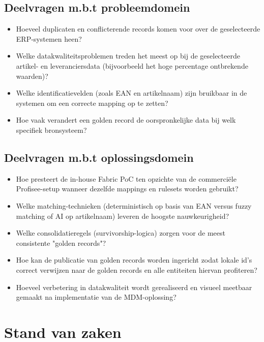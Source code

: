 \subsection{Deelvragen m.b.t probleemdomein}
\begin{itemize}
    \item Hoeveel duplicaten en conflicterende records komen voor over de geselecteerde ERP-systemen heen?
    \item Welke datakwaliteitsproblemen treden het meest op bij de geselecteerde artikel- en leveranciersdata (bijvoorbeeld het hoge percentage ontbrekende waarden)?
    \item Welke identificatievelden (zoals EAN en artikelnaam) zijn bruikbaar in de systemen om een correcte mapping op te zetten?
    \item Hoe vaak verandert een golden record de oorspronkelijke data bij welk specifiek bronsysteem?
\end{itemize}

\subsection{Deelvragen m.b.t oplossingsdomein}
\begin{itemize}
    \item Hoe presteert de in-house Fabric PoC ten opzichte van de commerciële Profisee-setup wanneer dezelfde mappings en rulesets worden gebruikt?
    \item Welke matching-technieken (deterministisch op basis van EAN versus fuzzy matching of AI op artikelnaam) leveren de hoogste nauwkeurigheid?
    \item Welke consolidatieregels (survivorship-logica) zorgen voor de meest consistente "golden records"?
    \item Hoe kan de publicatie van golden records worden ingericht zodat lokale id's correct verwijzen naar de golden records en alle entiteiten hiervan profiteren?
    \item Hoeveel verbetering in datakwaliteit wordt gerealiseerd en visueel meetbaar gemaakt na implementatie van de MDM-oplossing?
\end{itemize}






\section{Stand van zaken}%
\label{sec:stand-van-zaken}


